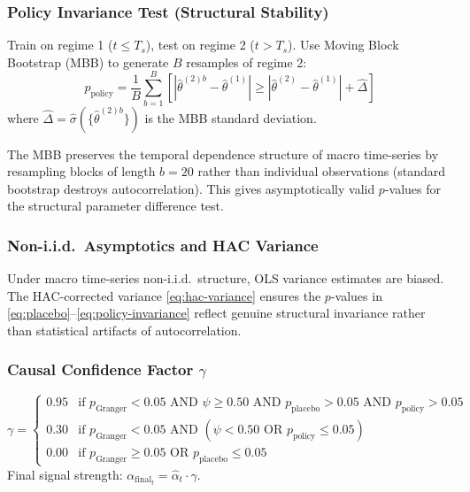 \documentclass[11pt]{article}
\begin{document}
\subsubsection{Policy Invariance Test (Structural Stability)}

Train on regime 1 ($t \leq T_s$), test on regime 2 ($t > T_s$). Use Moving Block Bootstrap (MBB) to generate $B$ resamples of regime 2:
\begin{equation}
p_{\text{policy}} = \frac{1}{B}\sum_{b=1}^{B}\left[\left|\hat{\theta}^{(2)b} - \hat{\theta}^{(1)}\right| \geq \left|\hat{\theta}^{(2)} - \hat{\theta}^{(1)}\right| + \hat{\Delta}\right]
\label{eq:policy-invariance}
\end{equation}
where $\hat{\Delta} = \hat{\sigma}(\{\hat{\theta}^{(2)b}\})$ is the MBB standard deviation.

The MBB preserves the temporal dependence structure of macro time-series by resampling blocks of length $b = 20$ rather than individual observations (standard bootstrap destroys autocorrelation). This gives asymptotically valid $p$-values for the structural parameter difference test.

\subsubsection{Non-i.i.d.\ Asymptotics and HAC Variance}

Under macro time-series non-i.i.d.\ structure, OLS variance estimates are biased. The HAC-corrected variance \eqref{eq:hac-variance} ensures the $p$-values in \eqref{eq:placebo}--\eqref{eq:policy-invariance} reflect genuine structural invariance rather than statistical artifacts of autocorrelation.

\subsubsection{Causal Confidence Factor $\gamma$}

\begin{equation}
\gamma =
\begin{cases}
0.95 & \text{if } p_{\text{Granger}} < 0.05 \text{ AND } \psi \geq 0.50 \text{ AND } p_{\text{placebo}} > 0.05 \text{ AND } p_{\text{policy}} > 0.05 \\
0.30 & \text{if } p_{\text{Granger}} < 0.05 \text{ AND } (\psi < 0.50 \text{ OR } p_{\text{policy}} \leq 0.05) \\
0.00 & \text{if } p_{\text{Granger}} \geq 0.05 \text{ OR } p_{\text{placebo}} \leq 0.05
\end{cases}
\label{eq:gamma}
\end{equation}
Final signal strength: $\alpha_{\text{final}_t} = \hat{\alpha}_t \cdot \gamma$.
\end{document}
